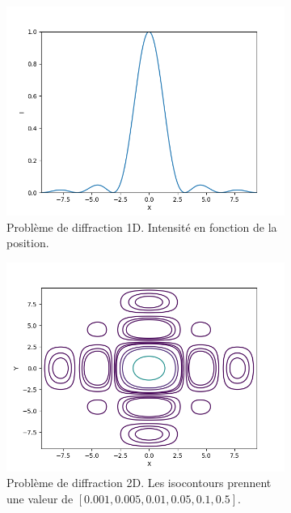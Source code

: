 \documentclass{article}
\begin{document}
\begin{figure}[H]
	\begin{subfigure}{0.45\linewidth}
		\includegraphics[scale=0.4]{imgs/diff.png}
		\caption{Problème de diffraction 1D. Intensité en fonction de la position.}
		\label{key}
	\end{subfigure}
	\hspace{0.5cm}
	\begin{subfigure}{0.45\linewidth}
		\includegraphics[scale=0.4]{imgs/contour_diffraction.png}
		\caption{Problème de diffraction 2D. Les isocontours prennent une valeur de $[0.001, 0.005, 0.01, 0.05, 0.1, 0.5]$.}
		\label{key}
	\end{subfigure}
	\caption{}
	\label{fig:diffraction}
\end{figure}
\end{document}

